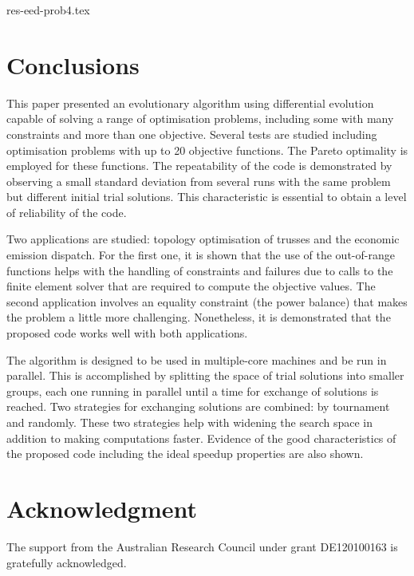 \documentclass[final,5p,times,twocolumn]{elsarticle}
\begin{document}
{res-eed-prob4.tex}



\section{Conclusions}

This paper presented an evolutionary algorithm using differential evolution capable of solving a
range of optimisation problems, including some with many constraints and more than one objective.
Several tests are studied including optimisation problems with up to 20 objective functions. The
Pareto optimality is employed for these functions. The repeatability of the code is demonstrated by
observing a small standard deviation from several runs with the same problem but different initial
trial solutions. This characteristic is essential to obtain a level of reliability of the code.

Two applications are studied: topology optimisation of trusses and the economic emission dispatch.
For the first one, it is shown that the use of the out-of-range functions helps with the handling of
constraints and failures due to calls to the finite element solver that are required to compute the
objective values. The second application involves an equality constraint (the power balance) that
makes the problem a little more challenging. Nonetheless, it is demonstrated that the proposed code
works well with both applications.

The algorithm is designed to be used in multiple-core machines and be run in parallel. This is
accomplished by splitting the space of trial solutions into smaller groups, each one running in
parallel until a time for exchange of solutions is reached. Two strategies for exchanging solutions
are combined: by tournament and randomly. These two strategies help with widening the search space
in addition to making computations faster. Evidence of the good characteristics of the proposed code
including the ideal speedup properties are also shown.


\section*{Acknowledgment}

The support from the Australian Research Council under grant DE120100163 is gratefully acknowledged.


\end{document}
